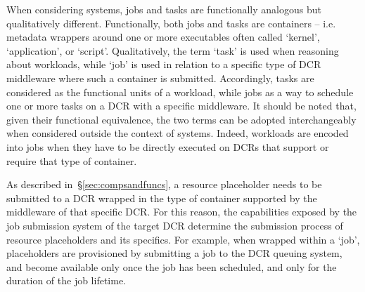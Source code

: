 \documentclass{sig-alternate}
\begin{document}
When considering \pilotjob systems, jobs and tasks are functionally analogous
but qualitatively different. Functionally, both jobs and tasks are containers --
i.e. metadata wrappers around one or more executables often called `kernel',
`application', or `script'. Qualitatively, the term `task' is used when
reasoning about workloads, while `job' is used in relation to a specific type of
DCR middleware where such a container is submitted. Accordingly, tasks are
considered as the functional units of a workload, while jobs as a way to
schedule one or more tasks on a DCR with a specific middleware.  It should be
noted that, given their functional equivalence, the two terms can be adopted
interchangeably when considered outside the context of \pilotjob systems.
Indeed, workloads are encoded into jobs when they have to be directly executed
on DCRs that support or require that type of container.




As described in~\S\ref{sec:compsandfuncs}, a resource placeholder needs to be
submitted to a DCR wrapped in the type of container supported by the middleware
of that specific DCR. For this reason, the capabilities exposed by the job
submission system of the target DCR determine the submission process of resource
placeholders and its specifics.  For example, when wrapped within a `job',
placeholders are provisioned by submitting a job to the DCR queuing system, and
become available only once the job has been scheduled, and only for the duration
of the job lifetime.
\end{document}
